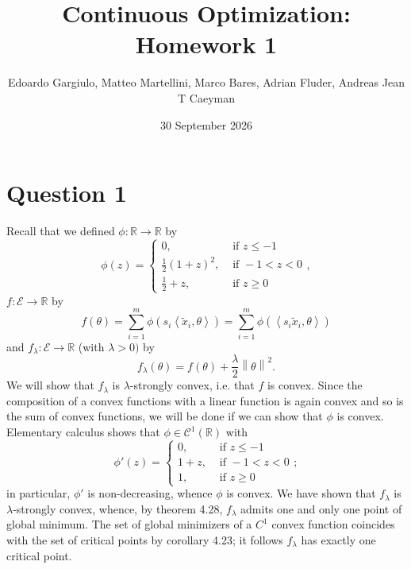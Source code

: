 \documentclass{article}
\title{Continuous Optimization: Homework 1}
\author{Edoardo Gargiulo, Matteo Martellini, Marco Bares, Adrian Fluder, Andreas Jean T Caeyman}
\date{30 September 2026}
\theoremstyle{definition}
\theoremstyle{remark}
\newcommand{\R}{\mathbb{R}}
\newcommand \norm[1]{\left\lVert #1 \right\rVert}
\newcommand\inn [2]{\left\langle #1{,}#2\right\rangle}
\begin{document}
\maketitle
\section*{Question 1}
Recall that we defined $\phi\colon \R\to \R$ by $$\phi(z)=\begin{cases}
    0, &\text{ if }z\leq -1\\
    \frac 12 (1+z)^2, &\text{ if }-1<z<0\\
    \frac 12 +z, &\text{ if }z\geq 0
\end{cases},$$  $f\colon \mathcal E\to \R$  by $$f(\theta)=\sum\limits_{i=1}^m  \phi\left( s_i\inn{{\tilde{x}_i}}{\theta} \right)=\sum\limits_{i=1}^m  \phi\left( \inn{{s_i\tilde{x}_i}}{\theta} \right)$$
and $f_{\lambda}\colon \mathcal E\to \R$ (with $\lambda>0)$ by
$$
f_\lambda(\theta)=f(\theta)+\frac{\lambda}{2}\norm{\theta}^2.
$$
We will show that $f_\lambda$ is $\lambda$-strongly convex, i.e. that $f$ is convex. Since the composition of a convex functions with a linear function is again convex and so is the sum of convex functions, we will be done if we can show that $\phi$ is convex.
Elementary calculus shows that $\phi\in \mathcal C^1(\R) $ with
$$\phi'(z)=\begin{cases}
    0, &\text{ if }z\leq -1\\
     1+z, &\text{ if }-1<z<0\\
    1, &\text{ if }z\geq 0
\end{cases};$$
in particular, $\phi'$ is non-decreasing, whence $\phi$ is convex.
We have shown that $f_\lambda$ is $\lambda$-strongly convex, whence, by theorem 4.28, $f_\lambda$ admits one and only one point of global minimum.
The set of global minimizers of a $C^1$ convex function coincides with the set of critical points by corollary 4.23; it follows $f_\lambda$ has exactly one critical point. 
\end{document}
